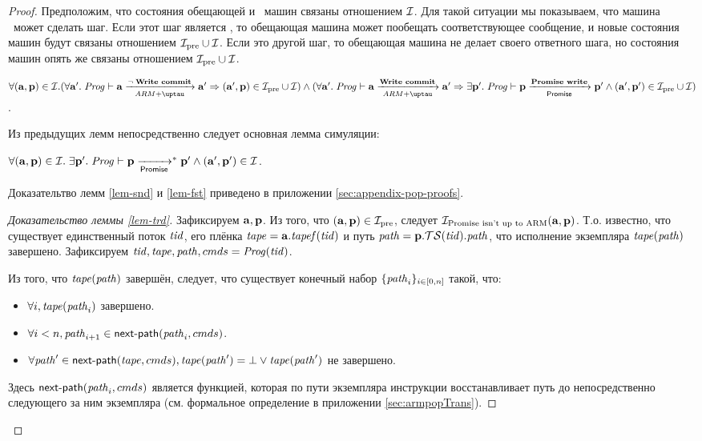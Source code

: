 \begin{proof}
Предположим, что состояния обещающей и \ARMt~машин связаны отношением $\mathcal{I}$.
Для такой ситуации мы показываем, что машина \ARMt~может сделать шаг.
Если этот шаг является , то обещающая машина
может пообещать соответствующее сообщение, и новые состояния машин будут
связаны отношением $\mathcal{I}_{\textup{\rm pre}} \cup \mathcal{I}$.
Если это другой шаг, то обещающая машина не делает своего ответного шага,
но состояния машин опять же связаны отношением $\mathcal{I}_{\textup{\rm pre}} \cup \mathcal{I}$.
\begin{lemma}
\label{lem-fst}
$\forall (\aT, \p) \in \simrel. \\
(\forall \aT'. \; \Cfprom \vdash \aT \armStepgen{\lnot \; \transenv{Write commit}} \aT' \Rightarrow (\aT', \p) \in \simrelPre \cup \simrel) \land {} \\
(\forall \aT'. \; \Cfprom \vdash \aT \armStepgen{\transenv{Write commit}} \aT' \Rightarrow
\exists \p'. \; \Cfprom \vdash \p \promStepgen{\transenv{Promise write}} \p' \land  (\aT', \p') \in \simrelPre \cup \simrel)$.
\end{lemma}
\noindent
Из предыдущих лемм непосредственно следует основная лемма симуляции:
\begin{lemma}
  \label{lem-fth}
$\forall (\mathbf{a}, \mathbf{p}) \in \mathcal{I}. \;
\exists \mathbf{p}'. \; \mathit{Prog} \vdash \mathbf{p} \xrightarrow[\mathsf{Promise}]{}^{*} \mathbf{p}' \land (\mathbf{a}', \mathbf{p}') \in \mathcal{I}$.
\end{lemma}

Доказательтво лемм \ref{lem-snd} и \ref{lem-fst} приведено в приложении \ref{sec:appendix-pop-proofs}.
\begin{proof}[Доказательство леммы \ref{lem-trd}]
  Зафиксируем $\mathbf{a}, \mathbf{p}$.
  Из того, что $(\mathbf{a}, \mathbf{p}) \in \mathcal{I}_{\textup{\rm pre}}$, следует $\mathcal{I}_{\textup{\rm Promise isn't up to ARM}}(\mathbf{a}, \mathbf{p})$.
  Т.о. известно, что существует единственный поток $\mathit{tid}$, его плёнка $\mathit{tape} = \mathbf{a}.\mathit{tapef}(\mathit{tid})$
  и путь $\mathit{path} = \mathbf{p}.\mathcal{TS}(\mathit{tid}).\mathit{path}$, что исполнение экземпляра $\mathit{tape}(\mathit{path})$ завершено.
  Зафиксируем $\mathit{tid}, \mathit{tape}, \mathit{path}, {cmds} = \mathit{Prog}(\mathit{tid})$.
  
  Из того, что $\mathit{tape}(\mathit{path})$ завершён, следует, что существует конечный набор
  $\{\mathit{path}_i\}_{i \in [0, n]}$ такой, что:
  \begin{itemize}
    \item $\forall i, \mathit{tape}(\mathit{path}_i)$ завершено.
    \item $\forall i < n, \mathit{path}_{i + 1} \in \mathsf{next}\textsf{-}\mathsf{path}(\mathit{path}_i, {cmds})$.
    \item $\forall \mathit{path}' \in \mathsf{next}\textsf{-}\mathsf{path}(\mathit{tape}, {cmds}), \mathit{tape}(\mathit{path}') = \bot \lor \mathit{tape}(\mathit{path}')$ не завершено.
  \end{itemize}
  Здесь $\mathsf{next}\textsf{-}\mathsf{path}(\mathit{path}_i, {cmds})$ является функцией, которая по пути экземпляра инструкции восстанавливает
  путь до непосредственно следующего за ним экземпляра (см. формальное определение в приложении \ref{sec:armpopTrans}).
  

\end{proof}
\end{proof}
